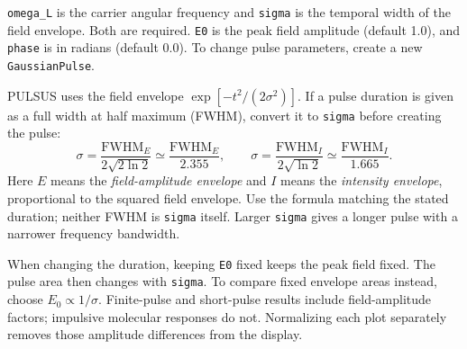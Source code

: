 \texttt{omega\_L} is the carrier angular frequency and \texttt{sigma}
is the temporal width of the field envelope. Both are required.
\texttt{E0} is the peak field amplitude (default 1.0), and
\texttt{phase} is in radians (default 0.0). To change pulse parameters,
create a new \texttt{GaussianPulse}.

PULSUS uses the field envelope $\exp[-t^2/(2\sigma^2)]$.
If a pulse duration is given as a full width at half maximum (FWHM),
convert it to \texttt{sigma} before creating the pulse:
\begin{equation}
 \sigma=\frac{\mathrm{FWHM}_{E}}{2\sqrt{2\ln2}}
       \simeq\frac{\mathrm{FWHM}_{E}}{2.355},
 \qquad
 \sigma=\frac{\mathrm{FWHM}_{I}}{2\sqrt{\ln2}}
       \simeq\frac{\mathrm{FWHM}_{I}}{1.665}.
\end{equation}
Here $E$ means the \emph{field-amplitude envelope} and $I$ means the
\emph{intensity envelope}, proportional to the squared field envelope.
Use the formula matching the stated duration; neither FWHM is
\texttt{sigma} itself. Larger \texttt{sigma} gives a longer pulse with a
narrower frequency bandwidth.

When changing the duration, keeping \texttt{E0} fixed keeps the peak
field fixed. The pulse area then changes with \texttt{sigma}. To compare
fixed envelope areas instead, choose $E_0\propto1/\sigma$. Finite-pulse
and short-pulse results include field-amplitude factors; impulsive
molecular responses do not. Normalizing each plot separately removes
those amplitude differences from the display.
